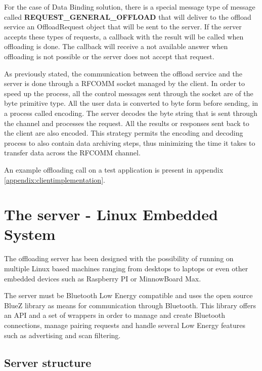 For the case of Data Binding solution, there is a special message type of message called \textbf{REQUEST_GENERAL_OFFLOAD} that will deliver to the offload service an OffloadRequest object that will be sent to the server. If the server accepts these types of requests, a callback with the result will be called when offloading is done. The callback will receive a not available answer when offloading is not possible or the server does not accept that request.

As previously stated, the communication between the offload service and the server is done through a RFCOMM socket managed by the client. In order to speed up the process, all the control messages sent through the socket are of the byte primitive type. All the user data is converted to byte form before sending, in a process called encoding. The server decodes the byte string that is sent through the channel and processes the request. All the results or responses sent back to the client are also encoded. This strategy permits the encoding and decoding process to also contain data archiving steps, thus minimizing the time it takes to transfer data across the RFCOMM channel.

An example offloading call on a test application is present in appendix \ref{appendix:clientimplementation}.

\pagebreak

\section{The server - Linux Embedded System}

The offloading server has been designed with the possibility of running on multiple Linux based machines ranging from desktops to laptops or even other embedded devices such as Raspberry PI or MinnowBoard Max.

The server must be Bluetooth Low Energy compatible and uses the open source BlueZ\cite{holtmann2007bluez} library as means for communication through Bluetooth. This library offers an API and a set of wrappers in order to manage and create Bluetooth connections, manage pairing requests and handle several Low Energy features such as advertising and scan filtering.


\subsection{Server structure}
\label{subsection:serverstructure}

